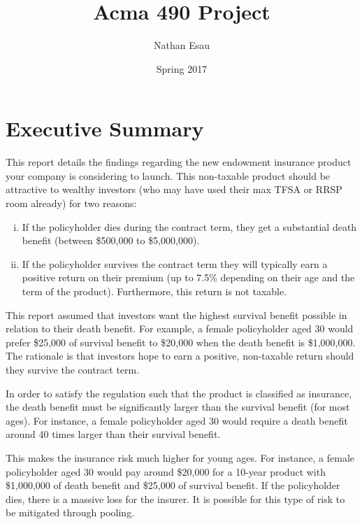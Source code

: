 \documentclass[12pt]{article}
\title{Acma 490 Project}
\author{Nathan Esau}
\date{Spring 2017}
\begin{document}
\nocite{*}

\maketitle

\tableofcontents

\newpage

\section{Executive Summary}

This report details the findings regarding the new endowment insurance product your company is considering to launch. This non-taxable product should be attractive to wealthy investors (who may have used their max TFSA or RRSP room already) for two reasons:

\begin{enumerate}[(i)]
\item If the policyholder dies during the contract term, they get a substantial death benefit (between \$500,000 to \$5,000,000).
\item If the policyholder survives the contract term they will typically earn a positive return on their premium (up to 7.5\% depending on their age and the term of the product). Furthermore, this return is not taxable.
\end{enumerate}

This report assumed that investors want the highest survival benefit possible in relation to their death benefit. For example, a female policyholder aged 30 would prefer \$25,000 of survival benefit to \$20,000 when the death benefit is \$1,000,000. The rationale is that investors hope to earn a positive, non-taxable return should they survive the contract term.

In order to satisfy the regulation such that the product is classified as insurance, the death benefit must be significantly larger than the survival benefit (for most ages). For instance, a female policyholder aged 30 would require a death benefit around 40 times larger than their survival benefit. 

This makes the insurance risk much higher for young ages. For instance, a female policyholder aged 30 would pay around \$20,000 for a 10-year product with \$1,000,000 of death benefit and \$25,000 of survival benefit. If the policyholder dies, there is a massive loss for the insurer. It is possible for this type of risk to be mitigated through pooling.
\end{document}
